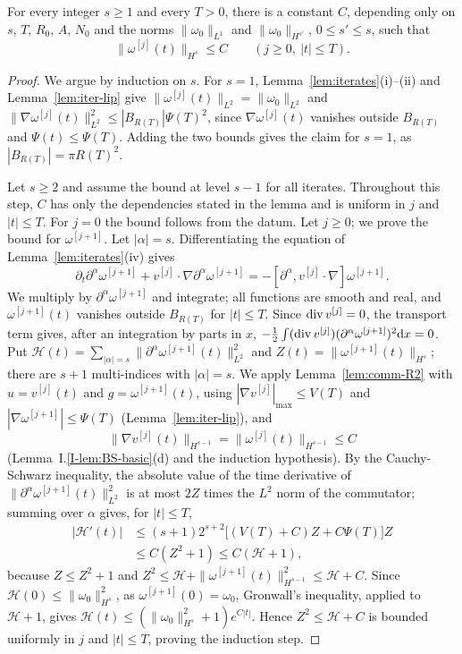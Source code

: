 \begin{lemma}
\label{lem:iter-Hs}
For every integer $s\ge1$ and every $T>0$, there is a constant $C$, depending
only on $s$, $T$, $R_0$, $A$, $N_0$ and the norms $\|\omega_0\|_{L^1}$ and
$\|\omega_0\|_{H^{s'}}$, $0\le s'\le s$, such that
\[
\|\omega^{[j]}(t)\|_{H^s}\le C\qquad(j\ge0,\ |t|\le T).
\]
\end{lemma}

\begin{proof}
We argue by induction on $s$. For $s=1$, Lemma~\ref{lem:iterates}(i)--(ii) and
Lemma~\ref{lem:iter-lip} give $\|\omega^{[j]}(t)\|_{L^2}=\|\omega_0\|_{L^2}$ and
$\|\nabla\omega^{[j]}(t)\|_{L^2}^2\le|B_{R(T)}|\Psi(T)^2$, since $\nabla\omega^{[j]}(t)$
vanishes outside $B_{R(T)}$ and $\Psi(t)\le\Psi(T)$. Adding the two bounds gives
the claim for $s=1$, as $|B_{R(T)}|=\pi R(T)^2$.

Let $s\ge2$ and assume the bound at level $s-1$ for all iterates. Throughout
this step, $C$ has only the dependencies stated in the lemma and is uniform
in $j$ and $|t|\le T$. For $j=0$ the bound follows from the datum. Let $j\ge0$; we
prove the bound for $\omega^{[j+1]}$. Let
$|\alpha|=s$. Differentiating the equation of Lemma~\ref{lem:iterates}(iv) gives
\[
\partial_t\partial^\alpha\omega^{[j+1]}+v^{[j]}\cdot\nabla\partial^\alpha\omega^{[j+1]}
=-[\partial^\alpha,v^{[j]}\cdot\nabla]\omega^{[j+1]} .
\]
We multiply by $\partial^\alpha\omega^{[j+1]}$ and integrate; all functions are
smooth and real, and $\omega^{[j+1]}(t)$ vanishes outside $B_{R(T)}$ for
$|t|\le T$. Since $\operatorname{div} v^{[j]}=0$, the transport term gives, after an
integration by parts in $x$,
$-\frac12\int(\operatorname{div} v^{[j]})(\partial^\alpha\omega^{[j+1]})^2\dd x=0$. Put
$\mathcal H(t)=\sum_{|\alpha|=s}\|\partial^\alpha\omega^{[j+1]}(t)\|_{L^2}^2$ and
$Z(t)=\|\omega^{[j+1]}(t)\|_{H^s}$; there are $s+1$ multi-indices with
$|\alpha|=s$. We apply Lemma~\ref{lem:comm-R2} with
$u=v^{[j]}(t)$ and $g=\omega^{[j+1]}(t)$, using $|\nabla v^{[j]}|_{\max}\le V(T)$
and $|\nabla\omega^{[j+1]}|\le\Psi(T)$ (Lemma~\ref{lem:iter-lip}), and
\[
\|\nabla v^{[j]}(t)\|_{H^{s-1}}=\|\omega^{[j]}(t)\|_{H^{s-1}}\le C
\]
(Lemma~I.\ref{I-lem:BS-basic}(d) and the induction hypothesis). By the
Cauchy-Schwarz inequality, the absolute value of the time derivative of
$\|\partial^\alpha\omega^{[j+1]}(t)\|_{L^2}^2$ is at most $2Z$ times the
$L^2$ norm of the commutator; summing over $\alpha$ gives, for
$|t|\le T$,
\begin{align*}
|\mathcal H'(t)|&\le(s+1)2^{s+2}\big[(V(T)+C)Z+C\Psi(T)\big]Z\\
&\le C(Z^2+1)\le C(\mathcal H+1),
\end{align*}
because $Z\le Z^2+1$ and $Z^2\le\mathcal H+\|\omega^{[j+1]}(t)\|_{H^{s-1}}^2\le\mathcal H+C$.
Since $\mathcal H(0)\le\|\omega_0\|_{H^s}^2$, as $\omega^{[j+1]}(0)=\omega_0$,
Gronwall's inequality, applied to $\mathcal H+1$, gives
$\mathcal H(t)\le(\|\omega_0\|_{H^s}^2+1)e^{C|t|}$. Hence $Z^2\le\mathcal H+C$
is bounded uniformly in $j$ and $|t|\le T$, proving the induction step.
\end{proof}

